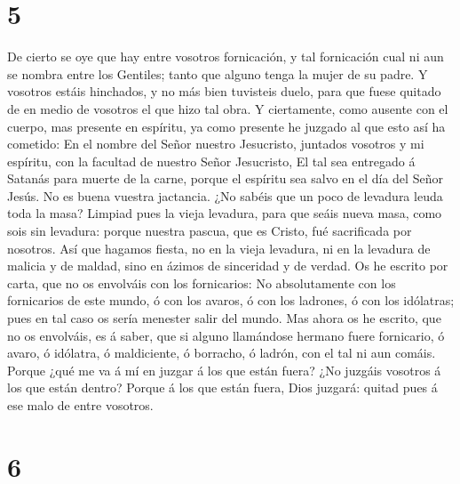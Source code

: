 \hypertarget{section-4}{%
\section{5}\label{section-4}}

 De cierto se oye que hay entre vosotros fornicación, y
tal fornicación cual ni aun se nombra entre los Gentiles; tanto que
alguno tenga la mujer de su padre.  Y vosotros estáis
hinchados, y no más bien tuvisteis duelo, para que fuese quitado de en
medio de vosotros el que hizo tal obra.  Y ciertamente,
como ausente con el cuerpo, mas presente en espíritu, ya como presente
he juzgado al que esto así ha cometido:  En el nombre del
Señor nuestro Jesucristo, juntados vosotros y mi espíritu, con la
facultad de nuestro Señor Jesucristo,  El tal sea
entregado á Satanás para muerte de la carne, porque el espíritu sea
salvo en el día del Señor Jesús.  No es buena vuestra
jactancia. ¿No sabéis que un poco de levadura leuda toda la masa?
 Limpiad pues la vieja levadura, para que seáis nueva
masa, como sois sin levadura: porque nuestra pascua, que es Cristo, fué
sacrificada por nosotros.  Así que hagamos fiesta, no en
la vieja levadura, ni en la levadura de malicia y de maldad, sino en
ázimos de sinceridad y de verdad.  Os he escrito por
carta, que no os envolváis con los fornicarios:  No
absolutamente con los fornicarios de este mundo, ó con los avaros, ó con
los ladrones, ó con los idólatras; pues en tal caso os sería menester
salir del mundo.  Mas ahora os he escrito, que no os
envolváis, es á saber, que si alguno llamándose hermano fuere
fornicario, ó avaro, ó idólatra, ó maldiciente, ó borracho, ó ladrón,
con el tal ni aun comáis.  Porque ¿qué me va á mí en
juzgar á los que están fuera? ¿No juzgáis vosotros á los que están
dentro?  Porque á los que están fuera, Dios juzgará:
quitad pues á ese malo de entre vosotros.

\hypertarget{section-5}{%
\section{6}\label{section-5}}

